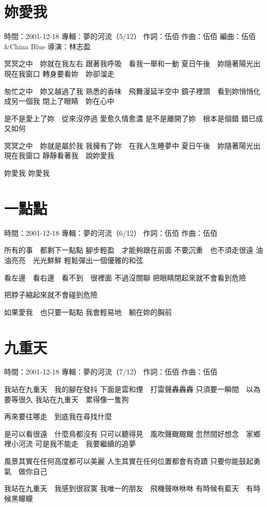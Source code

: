 \documentclass[UTF8,a4paper,oneside,twocolumn,12pt]{ctexbook}
\newcommand{\infopair}[2]{\textbullet #1：#2}
\newcommand{\zc}[1][伍佰]{\infopair{作詞}{#1}}
\newcommand{\zq}[1][伍佰]{\infopair{作曲}{#1}}
\newcommand{\bq}[1][伍佰]{\infopair{編曲}{#1}}
\newcommand{\zj}[1]{\infopair{專輯}{#1}}
\newcommand{\sj}[1]{\infopair{時間}{#1}}
\newenvironment{info}{\begin{flushleft}\kaishu
	}
	{\end{flushleft}\normalsize\yahei\par}
\newenvironment{lyric}{
	}
{}
\begin{document}
\section{妳愛我}
\begin{info}
	\sj{2001-12-18}
	\zj{夢的河流（5/12）}
	\zc
	\zq
	\bq[伍佰\&China Blue]
	\infopair{導演}{林志盈}
\end{info}
\begin{lyric}
	冥冥之中　妳就在我左右
	跟著我呼吸　看我一舉和一動
	夏日午後　妳隨著陽光出現在我窗口
	轉身要看妳　妳卻溜走

	匆忙之中　妳又越過了我
	熟悉的香味　飛舞漫延半空中
	鏡子裡頭　看到妳悄悄化成另一個我
	閉上了眼睛　妳在心中

	是不是愛上了妳　從來沒停過
	愛愈久情愈濃
	是不是離開了妳　根本是個錯
	錯已成又如何

	冥冥之中　妳就是屬於我
	我擁有了妳　在我人生睡夢中
	夏日午後　妳隨著陽光出現在我窗口
	靜靜看著我　說妳愛我

	妳愛我
	妳愛我
\end{lyric}

\section{一點點}
\begin{info}
	\sj{2001-12-18}
	\zj{夢的河流（6/12）}
	\zc
	\zq
\end{info}
\begin{lyric}
	所有的事　都剩下一點點
	腳步輕盈　才能夠跟在前面
	不要沉重　也不須走很遠
	油油亮亮　光光鮮鮮
	輕鬆彈出一個優雅的和弦

	看左邊　看右邊　看不到　很裡面
	不過沒關聯
	把眼睛閉起來就不會看到危險

	把脖子縮起來就不會碰到危險

	如果愛我　也只要一點點
	我會輕易地　躺在妳的胸前
\end{lyric}

\section{九重天}
\begin{info}
	\sj{2001-12-18}
	\zj{夢的河流（7/12）}
	\zc
	\zq
\end{info}
\begin{lyric}
	我站在九重天　我的腳在發抖
	下面是雲和煙　打雷聲轟轟轟
	只須要一瞬間　以為要等很久
	我站在九重天　累得像一隻狗

	再來要往哪走　到底我在尋找什麼

	是可以看很遠　什麼鳥都沒有
	只可以聽得見　風吹聲颼颼颼
	忽然間好想念　家鄉裡小河流
	可是我不能走　我要繼續的追夢

	風景其實在任何高度都可以美麗
	人生其實在任何位置都會有奇蹟
	只要你能鼓起勇氣　做你自己

	我站在九重天　我感到很寂寞
	我唯一的朋友　飛機聲咻咻咻
	有時候有藍天　有時候黑矇矇
\end{lyric}
\end{document}
